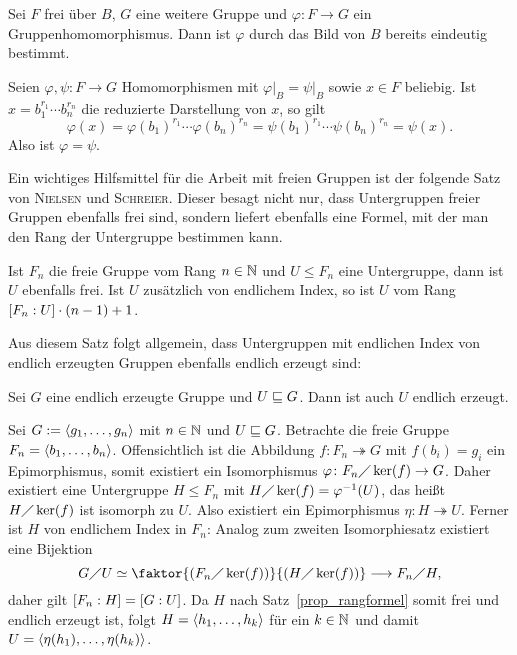 \begin{lemma}
\label{lemma_anz_hom}
	Sei $F$ frei über $B$, $G$ eine weitere Gruppe und $\varphi \colon F \rightarrow G$ ein Gruppenhomomorphismus. Dann ist $\varphi$ durch das Bild von $B$ bereits eindeutig bestimmt.
\end{lemma}

\begin{beweis}
	Seien $\varphi, \psi\colon F \rightarrow G$ Homomorphismen mit $\varphi \big|_B = \psi \big|_B$ sowie $x \in F$ beliebig. Ist $x = b_1^{r_1} \cdots b_n^{r_n}$ die reduzierte Darstellung von $x$, so gilt
	\[
		\varphi(x) = \varphi(b_1)^{r_1} \cdots \varphi(b_n)^{r_n} = \psi(b_1)^{r_1} \cdots \psi(b_n)^{r_n} = \psi(x).
	\]
	Also ist $\varphi = \psi$.
\end{beweis}

Ein wichtiges Hilfsmittel für die Arbeit mit freien Gruppen ist der folgende Satz von \textsc{Nielsen} und \textsc{Schreier}. Dieser besagt nicht nur, dass Untergruppen freier Gruppen ebenfalls frei sind, sondern liefert ebenfalls eine Formel, mit der man den Rang der Untergruppe bestimmen kann.

\begin{satz}
\label{prop_rangformel}
	Ist $F_n$ die freie Gruppe vom Rang $n \in \mathbb{N}$ und $U \leq F_n$ eine Untergruppe, dann ist $U$ ebenfalls frei. Ist $U$ zusätzlich von endlichem Index, so ist $U$ vom Rang $\left\lbrack F_n:U\right\rbrack \cdot (n - 1)+1$.
\end{satz}

Aus diesem Satz folgt allgemein, dass Untergruppen mit endlichen Index von endlich erzeugten Gruppen ebenfalls endlich erzeugt sind:

\begin{korollar}
\label{endl_erz_untergruppe}
	Sei $G$ eine endlich erzeugte Gruppe und $U \sqsubseteq G$. Dann ist auch $U$ endlich erzeugt.
\end{korollar}

\begin{beweis}
	Sei $G := \langle g_1,\dots,g_n\rangle$ mit $n \in \mathbb{N}$ und $U \sqsubseteq G$. Betrachte die freie Gruppe $F_n = \langle b_1,\dots,b_n\rangle$. Offensichtlich ist die Abbildung $f\colon F_n \twoheadrightarrow G$ mit $f(b_i) = g_i$ ein Epimorphismus, somit existiert ein Isomorphismus $\varphi \colon F_n \diagup \ker(f) \rightarrow G$. Daher existiert eine Untergruppe $H \leq F_n$ mit $H \diagup \ker(f) = \varphi^{-1}(U)$, das heißt $H \diagup \ker(f)$ ist isomorph zu $U$. Also existiert ein Epimorphismus $\eta \colon H \twoheadrightarrow U$. Ferner ist $H$ von endlichem Index in $F_n$: Analog zum zweiten Isomorphiesatz existiert eine Bijektion \\[-.5cm]
	\[
		G\diagup U \simeq \faktor{(F_n \diagup \ker(f))}{(H \diagup \ker(f))} \longrightarrow F_n \diagup H,
	\]
	daher gilt $\left\lbrack F_n : H\right\rbrack = \left\lbrack G : U\right\rbrack$.
	Da $H$ nach Satz~\ref{prop_rangformel} somit frei und endlich erzeugt ist, folgt $H = \langle h_1, \dots, h_k\rangle$ für ein $k \in \mathbb{N}$ und damit $U = \langle\eta(h_1),\dots,\eta(h_k)\rangle$. \qedhere
\end{beweis}

